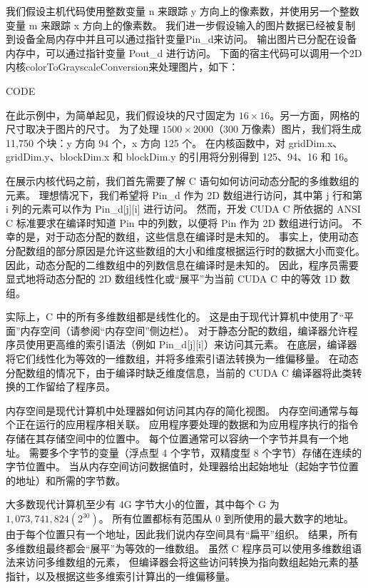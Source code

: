 我们假设主机代码使用整数变量 n 来跟踪 y 方向上的像素数，并使用另一个整数变量 m 来跟踪 x 方向上的像素数。 
我们进一步假设输入的图片数据已经被复制到设备全局内存中并且可以通过指针变量Pin\_d来访问。 
输出图片已分配在设备内存中，可以通过指针变量 Pout\_d 进行访问。 
下面的宿主代码可以调用一个2D内核colorToGrayscaleConversion来处理图片，如下：

{\color{red} CODE}

在此示例中，为简单起见，我们假设块的尺寸固定为 $16 \times 16$。另一方面，网格的尺寸取决于图片的尺寸。 
为了处理 $1500 \times 2000$（300 万像素）图片，我们将生成 11,750 个块：y 方向 94 个，x 方向 125 个。 
在内核函数中，对 gridDim.x、gridDim.y、blockDim.x 和 blockDim.y 的引用将分别得到 125、94、16 和 16。

在展示内核代码之前，我们首先需要了解 C 语句如何访问动态分配的多维数组的元素。 
理想情况下，我们希望将 Pin\_d 作为 2D 数组进行访问，其中第 j 行和第 i 列的元素可以作为 Pin\_d[j][i] 进行访问。 
然而，开发 CUDA C 所依据的 ANSI C 标准要求在编译时知道 Pin 中的列数，以便将 Pin 作为 2D 数组进行访问。 
不幸的是，对于动态分配的数组，这些信息在编译时是未知的。 
事实上，使用动态分配数组的部分原因是允许这些数组的大小和维度根据运行时的数据大小而变化。 
因此，动态分配的二维数组中的列数信息在编译时是未知的。 
因此，程序员需要显式地将动态分配的 2D 数组线性化或“展平”为当前 CUDA C 中的等效 1D 数组。

实际上，C 中的所有多维数组都是线性化的。 这是由于现代计算机中使用了“平面”内存空间（请参阅“内存空间”侧边栏）。 
对于静态分配的数组，编译器允许程序员使用更高维的索引语法（例如 Pin\_d[j][i]）来访问其元素。 
在底层，编译器将它们线性化为等效的一维数组，并将多维索引语法转换为一维偏移量。 
在动态分配数组的情况下，由于编译时缺乏维度信息，当前的 CUDA C 编译器将此类转换的工作留给了程序员。

\begin{remark}[内存空间]
内存空间是现代计算机中处理器如何访问其内存的简化视图。 内存空间通常与每个正在运行的应用程序相关联。 
应用程序要处理的数据和为应用程序执行的指令存储在其存储空间中的位置中。 每个位置通常可以容纳一个字节并具有一个地址。 
需要多个字节的变量（浮点型 4 个字节，双精度型 8 个字节）存储在连续的字节位置中。 
当从内存空间访问数据值时，处理器给出起始地址（起始字节位置的地址）和所需的字节数。

大多数现代计算机至少有 4G 字节大小的位置，其中每个 G 为 $1,073,741,824(2^{30})$。 
所有位置都标有范围从 0 到所使用的最大数字的地址。 由于每个位置只有一个地址，因此我们说内存空间具有“扁平”组织。 
结果，所有多维数组最终都会“展平”为等效的一维数组。 虽然 C 程序员可以使用多维数组语法来访问多维数组的元素，
但编译器会将这些访问转换为指向数组起始元素的基指针，以及根据这些多维索引计算出的一维偏移量。
\end{remark}


